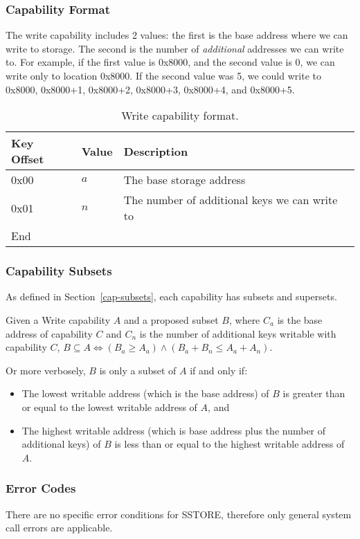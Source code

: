 \documentclass[english,a4paper]{article}
\let\oldparagraph\subsubsection
\renewcommand{\subsubsection}[1]{\oldparagraph{#1}\mbox{}}
\begin{document}
\subsubsection{Capability Format}
The write capability includes 2 values: the first is the base address where we
can write to storage. The second is the number of \emph{additional} addresses we
can write to. For example, if the first value is 0x8000, and the second value is
0, we can write only to location 0x8000. If the second value was 5, we could
write to 0x8000, 0x8000+1, 0x8000+2, 0x8000+3, 0x8000+4, and 0x8000+5.

\begin{table}[H]
  \caption{Write capability format.}
  \centering{}%
  \begin{tabular}{l|l|p{}}
    \hline
    Key Offset & Value & Description\tabularnewline
    \hline
    \hline
    0x00 & $a$ & The base storage address\tabularnewline
    0x01 & $n$ & The number of additional keys we can write to\tabularnewline
    \hline
    End &  \tabularnewline
    \hline
  \end{tabular}
\end{table}

\subsubsection{Capability Subsets}
As defined in Section~\ref{cap-subsets}, each capability has subsets and
supersets.

Given a Write capability $A$ and a proposed subset $B$, where $C_a$ is the base
address of capability $C$ and $C_n$ is the number of additional keys writable
with capability $C$, $B \subseteq A \iff \left(B_a \geq A_a\right) \land
\left(B_a + B_n \leq A_a + A_n\right)$.

Or more verbosely, $B$ is only a subset of $A$ if and only if:
\begin{itemize}
  \item The lowest writable address (which is the base address) of $B$ is
  greater than or equal to the lowest writable address of $A$, and
  \item The highest writable address (which is base address plus the number of
  additional keys) of $B$ is less than or equal to the highest writable address
  of $A$.
\end{itemize}

\subsubsection{Error Codes}
There are no specific error conditions for SSTORE, therefore only general system
call errors are applicable.
\end{document}
